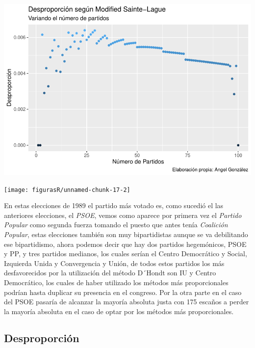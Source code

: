 \documentclass[12pt,a4paper,]{book}
\numberwithin{dummy}{section}
\theoremstyle{ocrenumbox}
\theoremstyle{blacknumex}
\theoremstyle{blacknumbox}
\theoremstyle{ocrenum}
\theoremstyle{ocrenum}
\begin{document}
\begin{center}\includegraphics[width=1\linewidth]{figurasR/unnamed-chunk-17-1} \end{center}

\begin{center}\texttt{[image: figurasR/unnamed-chunk-17-2]} \end{center}

En estas elecciones de 1989 el partido más votado es, como sucedió el
las anteriores elecciones, el \emph{PSOE}, vemos como aparece por
primera vez el \emph{Partido Popular} como segunda fuerza tomando el
puesto que antes tenía \emph{Coalición Popular}, estas elecciones
también son muy bipartidistas aunque se va debilitando ese bipartidismo,
ahora podemos decir que hay dos partidos hegemónicos, PSOE y PP, y tres
partidos medianos, los cuales serían el Centro Democrático y Social,
Izquierda Unida y Convergencia y Unión, de todos estos partidos los más
desfavorecidos por la utilización del método D´Hondt son IU y Centro
Democrático, los cuales de haber utilizado los métodos más
proporcionales podrían hasta duplicar su presencia en el congreso. Por
la otra parte en el caso del PSOE pasaría de alcanzar la mayoría
absoluta justa con 175 escaños a perder la mayoría absoluta en el caso
de optar por los métodos más proporcionales.

\hypertarget{desproporciuxf3n-4}{%
\subsection{Desproporción}\label{desproporciuxf3n-4}}
\end{document}

